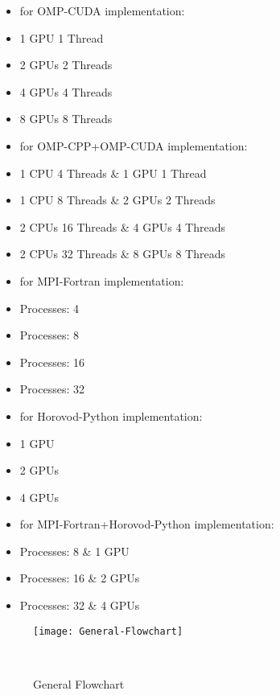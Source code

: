 \begin{itemize}
\begin{itemize}
            \item for OMP-CUDA implementation:
            \item 1 GPU 1 Thread
            \item 2 GPUs 2 Threads
            \item 4 GPUs 4 Threads
            \item 8 GPUs 8 Threads
        \end{itemize}
        \begin{itemize}
            \item for OMP-CPP+OMP-CUDA implementation:
            \item 1 CPU 4 Threads \& 1 GPU 1 Thread
            \item 1 CPU 8 Threads \& 2 GPUs 2 Threads
            \item 2 CPUs 16 Threads \& 4 GPUs 4 Threads
            \item 2 CPUs 32 Threads \& 8 GPUs 8 Threads
        \end{itemize}
        \begin{itemize}
            \item for MPI-Fortran implementation:
            \item Processes: 4
            \item Processes: 8
            \item Processes: 16
            \item Processes: 32
        \end{itemize}
        \begin{itemize}
            \item for Horovod-Python implementation:
            \item 1 GPU
            \item 2 GPUs
            \item 4 GPUs
        \end{itemize}
        \begin{itemize}
            \item for MPI-Fortran+Horovod-Python implementation:
            \item Processes: 8 \& 1 GPU
            \item Processes: 16 \& 2 GPUs
            \item Processes: 32 \& 4 GPUs
        \end{itemize}
\end{itemize}

\begin{figure}[!htb]
    \centering
    \texttt{[image: General-Flowchart]}
    \caption{General Flowchart}~\label{fig:General-Flowchart}
\end{figure}

